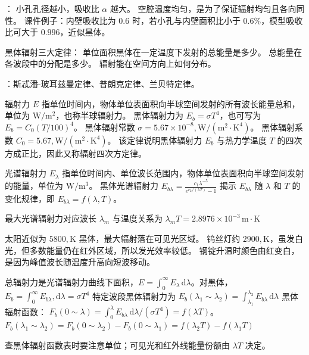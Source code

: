 ：
小孔孔径越小，吸收比 $\alpha$ 越大。
空腔温度均匀，是为了保证辐射均匀且各向同性。
课件例子：内壁吸收比为 $0.6$ 时，若小孔与内壁面积比小于 $0.6\%$，模型吸收比可大于 $0.996$，近似黑体。

黑体辐射三大定律：
单位面积黑体在一定温度下发射的总能量是多少。
总能量在各波段中的分配是多少。
辐射能在空间方向上如何分布。

：斯忒潘-玻耳兹曼定律、普朗克定律、兰贝特定律。

辐射力 $E$ 指单位时间内，物体单位表面积向半球空间发射的所有波长能量总和，单位为 $\mathrm{W}/\mathrm{m}^2$，也称半球辐射力。
黑体辐射力为 $E_b=\sigma T^4$，也可写为 $E_b=C_0(T/100)^4$。
黑体辐射常数 $\sigma=5.67\times10^{-8},\mathrm{W}/(\mathrm{m}^2\cdot\mathrm{K}^4)$。
黑体辐射系数 $C_0=5.67,\mathrm{W}/(\mathrm{m}^2\cdot\mathrm{K}^4)$。
该定律说明黑体辐射力 $E_b$ 与热力学温度 $T$ 的四次方成正比，因此又称辐射四次方定律。


光谱辐射力 $E_\lambda$ 指单位时间内、单位波长范围内，物体单位表面积向半球空间发射的能量，单位为 $\mathrm{W}/\mathrm{m}^3$。
黑体光谱辐射力 $E_{b\lambda}=\frac{c_1\lambda^{-5}}{e^{c_2/(\lambda T)}-1}$ 揭示 $E_{b\lambda}$ 随 $\lambda$ 和 $T$ 的变化规律，即 $E_{b\lambda}=f(\lambda,T)$。


最大光谱辐射力对应波长 $\lambda_m$ 与温度关系为 $\lambda_m T=2.8976\times10^{-3}\,\mathrm{m}\cdot\mathrm{K}$

太阳近似为 $5800,\mathrm{K}$ 黑体，最大辐射落在可见光区域。
钨丝灯约 $2900,\mathrm{K}$，虽发白光，但多数能量仍在红外区域，所以发光效率较低。
钢锭升温时颜色由红变白，是因为峰值波长随温度升高向短波移动。


总辐射力是光谱辐射力曲线下面积，$E=\int_0^\infty E_\lambda\,\mathrm{d}\lambda$。对黑体，$E_b=\int_0^\infty E_{b\lambda},\mathrm{d}\lambda=\sigma T^4$
特定波段黑体辐射力为 $E_b(\lambda_1\sim\lambda_2)=\int_{\lambda_1}^{\lambda_2}E_{b\lambda}\,\mathrm{d}\lambda$
黑体辐射函数：
$F_b(0\sim\lambda)=\int_0^\lambda E_{b\lambda}\,\mathrm{d}\lambda/(\sigma T^4)=f(\lambda T)$。\\
$F_b(\lambda_1\sim\lambda_2)=F_b(0\sim\lambda_2)-F_b(0\sim\lambda_1)=f(\lambda_2T)-f(\lambda_1T)$

查黑体辐射函数表时要注意单位；可见光和红外线能量份额由 $\lambda T$ 决定。


